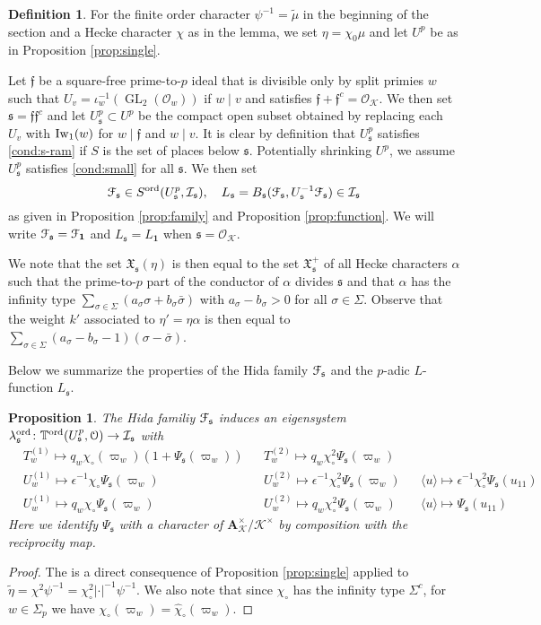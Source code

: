 \documentclass[leqno]{amsart}
\newtheorem{prop}[thm]{Proposition}
\theoremstyle{definition}
\newtheorem{defn}[thm]{Definition}
\theoremstyle{remark}
\newcommand{\id}{\mathbf{1}}
\newcommand{\oo}{\mathcal{O}}
\newcommand{\eo}{\EuScript{O}}
\newcommand{\A}{\mathbf A}
\DeclareMathOperator{\GL}{GL}
\newcommand{\ff}{\mathfrak{f}}
\newcommand{\fs}{\mathfrak{s}}
\newcommand{\K}{{\mathcal{K}}} %
\newcommand{\fX}{\mathfrak{X}}
\newcommand{\Iw}{\textnormal{Iw}} %
\newcommand{\TT}{\mathbb{T}} %
\newcommand{\euF}{\EuScript{F}} %
\newcommand{\I}{\mathcal{I}} %
\newcommand{\ord}{\textnormal{ord}} %
\begin{document}
\begin{defn}\label{def:family_at_s}
For the finite order character
$\psi^{-1}=\tilde{\mu}$
in the beginning of the section
and a Hecke character $\chi$ as in the lemma,
we set $\eta=\chi_0\mu$
and let $U^p$ be as in Proposition \ref{prop:single}.

Let $\ff$ be a square-free prime-to-$p$ ideal
that is divisible only by split primies $w$
such that $U_v=\iota_w^{-1}(\GL_2(\oo_w))$
if $w\mid v$ and satisfies $\ff+\ff^c=\oo_\K$.
We then set $\fs=\ff\ff^c$ and 
let $U^p_\fs\subset U^p$ be the compact open subset
obtained by replacing each $U_v$ with $\Iw_1(w)$
for $w\mid\ff$ and $w\mid v$.
It is clear by definition that $U^p_\fs$
satisfies \eqref{cond:s-ram} 
if $S$ is the set of places below $\fs$.
Potentially shrinking $U^p$, we assume $U^p_{\fs}$
satisfies \eqref{cond:small} for all $\fs$. 
We then set
\[
    \euF_{\fs}\in 
    S^{\ord}(U^p_{\fs},\I_\fs),\quad
    L_\fs=B_\fs(\euF_{\fs}, U_\fs^{-1}\euF_{\fs})
    \in \I_\fs
\]
as given in Proposition \ref{prop:family} and
Proposition \ref{prop:function}.
We will write $\euF_\fs=\euF_\id$ and $L_\fs=L_\id$
when $\fs=\oo_\K$.


We note that the set $\fX_\fs(\eta)$ is then
equal to the set $\fX_\fs^+$ of all Hecke characters $\alpha$
such that the prime-to-$p$ part of the conductor
of $\alpha$ divides $\fs$ 
and that $\alpha$ has the infinity type
$\sum_{\sigma\in\Sigma}(a_\sigma\sigma+b_\sigma\bar{\sigma})$
with $a_\sigma-b_\sigma>0$ for all $\sigma\in \Sigma$.
Observe that the weight $k'$ associated to $\eta'=\eta\alpha$
is then equal to 
$\sum_{\sigma\in\Sigma}(a_\sigma-b_\sigma-1)(\sigma-\bar{\sigma})$.
\end{defn}

Below we summarize the properties of 
the Hida family $\euF_\fs$ and the $p$-adic $L$-function $L_\fs$.


\begin{prop}\label{prop:eigensystem}
The Hida familiy $\euF_\fs$ induces an eigensystem
$\lambda_{\fs}^{\ord}\colon \TT^{\ord}(U^p_\fs,\eo)\to\I_\fs$ with
\begin{align*}
&T_w^{(1)}\mapsto
q_w\chi_\circ(\varpi_w)(1+\Psi_\fs(\varpi_w))&
&T_w^{(2)}\mapsto q_w\chi_\circ^2\Psi_\fs(\varpi_w)\\
&U_{w}^{(1)}\mapsto
\epsilon^{-1}\chi_\circ\Psi_\fs(\varpi_w)&
&U_{w}^{(2)}\mapsto
\epsilon^{-1}\chi_\circ^2\Psi_\fs(\varpi_w)&
&\langle u\rangle\mapsto
\epsilon^{-1}\chi_\circ^2\Psi_\fs(u_{11})\\
&U_{w}^{(1)}\mapsto q_w\chi_\circ\Psi_\fs(\varpi_w)&
&U_{w}^{(2)}\mapsto q_w\chi_\circ^2\Psi_\fs(\varpi_w)&
&\langle u\rangle\mapsto \Psi_\fs(u_{11})
\end{align*}
Here we identify $\Psi_\fs$ with a character of 
$\A_{\K}^\times/\K^\times$ by composition with the 
reciprocity map.
\end{prop}
\begin{proof}
The is a direct consequence of Proposition \ref{prop:single}
applied to 
$\tilde{\eta}=\chi^2\psi^{-1}=\chi_\circ^2|\cdot|^{-1}\psi^{-1}$.
We also note that since $\chi_\circ$ has the infinity type $\Sigma^c$,
for $w\in \Sigma_p$ we have 
$\chi_\circ(\varpi_w)=\hat{\chi}_\circ(\varpi_w)$.
\end{proof}
\end{document}
